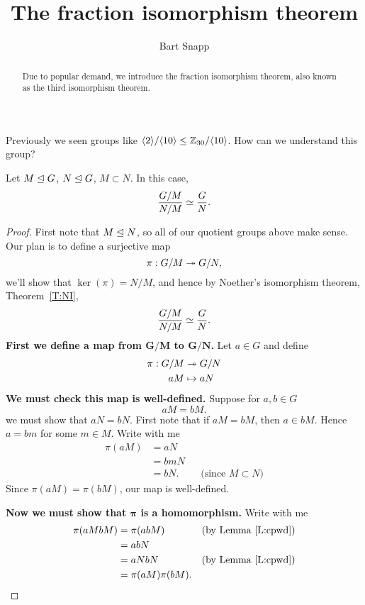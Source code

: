 \documentclass{ximera}
\author{Bart Snapp}
\title{The fraction isomorphism theorem}
\begin{document}
\begin{abstract}
  Due to popular demand, we introduce the fraction isomorphism
  theorem, also known as the third isomorphism theorem.
\end{abstract}
\maketitle


Previously we seen groups like $\langle2\rangle/\langle10\rangle\leq
\mathbb Z_{30}/\langle10\rangle$. How can we understand this group?




\begin{theorem}
  Let $M\trianglelefteq G$, $N\trianglelefteq G$, $M\subset N$. In this case,
  \[
  \frac{G/M}{N/M} \simeq \frac{G}{N}.
  \]
  \begin{proof}
    First note that $M\trianglelefteq N$, so all of our quotient groups above
    make sense. Our plan is to define a surjective map
    \[
    \pi:G/M \twoheadrightarrow G/N,
    \]
    we'll show that $\ker(\pi) = N/M$, and hence by Noether's
    isomorphism theorem, Theorem~\ref{T:NI},
    \[
    \frac{G/M}{N/M} \simeq \frac{G}{N}.
    \]
    \textbf{First we define a map from $\boldsymbol{G/M}$ to
      $\boldsymbol{G/N}$.} Let $a\in G$ and define
    \begin{align*}
      \pi: G/M &\twoheadrightarrow G/N \\
      aM &\mapsto aN
    \end{align*}
    \textbf{We must check this map is
      well-defined.} Suppose for $a,b\in G$
    \[
    a M = bM.
    \]
    we must show that $aN = bN$. First note that if $aM = bM$, then $a
    \in bM$. Hence $a=bm$ for some $m\in M$. Write with me
    \begin{align*}
      \pi(aM) &= aN\\
      &= bm N\\
      &= bN.  & &\text{(since $M\subset N$)}
    \end{align*}
    Since $\pi(a M) = \pi(bM)$, our map is well-defined.

    \textbf{Now we must show that $\boldsymbol\pi$ is a homomorphism.}
    Write with me
    \begin{align*}
      \pi(aMbM) &= \pi(ab M) & &\text{(by  Lemma~\ref{L:cpwd})} \\
      &= ab N \\
      &= aN bN & &\text{(by  Lemma~\ref{L:cpwd})} \\
      &= \pi(aM)\pi(bM).
    \end{align*}



\end{proof}
\end{theorem}
\end{document}
